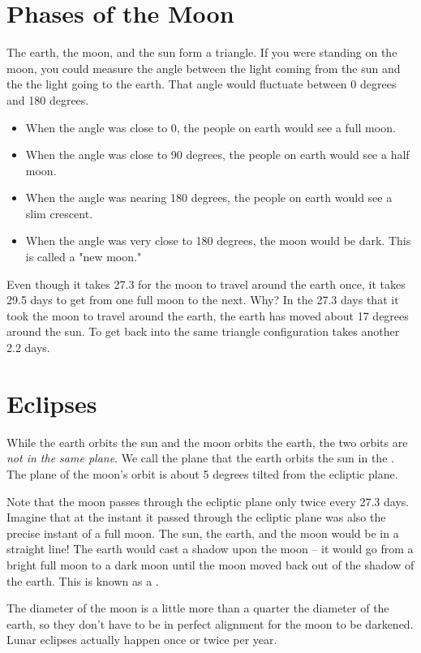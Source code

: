 \section{Phases of the Moon}

The earth, the moon, and the sun form a triangle.   If you were standing on the moon,  you could measure the angle between the light coming from the sun and the the light going to the earth.   That angle would fluctuate between 0 degrees and 180 degrees.  
\begin{itemize}
\item When the angle was close to 0,  the people on earth would see a full moon.  
\item When the angle was close to 90 degrees,  the people on earth would see a half moon. 
\item When the angle was nearing 180 degrees, the people on earth would see a slim crescent.
\item When the angle was very close to 180 degrees,  the moon would be dark.  This is called a "new moon." 
\end{itemize}


Even though it takes 27.3 for the moon to travel around the earth once,   it takes 29.5 days to get from one full moon to the next. Why?  In the 27.3 days that it took the moon to travel around the earth,  the earth has moved about 17 degrees around the sun.  To get back into the same triangle configuration takes another 2.2 days.

\section{Eclipses}

While the earth orbits the sun and the moon orbits the earth,  the two orbits are \emph{not in the same plane}.
We call the plane that the earth orbits the sun in the .   The plane of the moon's orbit is about  5 degrees tilted from the ecliptic plane.

Note that the moon passes through the ecliptic plane only twice every 27.3 days.   Imagine that at the instant it passed through the ecliptic plane was also the precise instant of a full moon.    The sun, the earth, and the moon would be in a straight line!  The earth would cast a shadow upon the moon -- it would go from a bright full moon to a dark moon until the moon moved back out of the shadow of the earth.   This is known as a .

The diameter of the moon is a little more than a quarter the diameter of the earth,  so they don't have to be in perfect alignment for the moon to be darkened.   Lunar eclipses actually happen once or twice per year.

